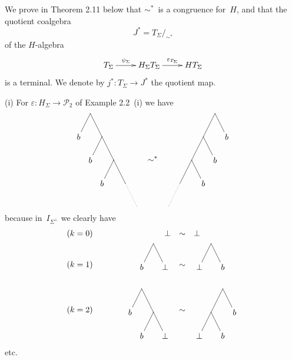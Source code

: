 \documentclass{entcs}
\newcommand{\sims}{\ensuremath{\mathrel{\sim^*}}}
\newcommand{\PP}{\ensuremath{\mathscr{P}}}
\newenvironment{pv}[1]{\begin{trivlist}
\item[\hspace{\labelsep}\normalfont\bfseries#1]}%
{\end{trivlist}}
\begin{document}
\begin{pv}{Remark}
We prove in Theorem 2.11 below that \sims~is a congruence for~$H$,
and that the quotient coalgebra
\[J^*=T_\Sigma/_{\sims}\]
of the  $H$-algebra\vspace{1mm}
\[
\xy
\xymatrix{
T_\Sigma
\ar[0,1]^-{\psi_\Sigma}
&
H_\Sigma T_\Sigma
\ar[0,1]^-{\varepsilon_{T_\Sigma}}
&
HT_\Sigma
}
\endxy
\]
is a terminal. We denote by $j^*\colon T_\Sigma\to J^*$ the quotient
map.
\end{pv}

\begin{pv}{2.10 Examples}
(i) For $\varepsilon\colon H_\Sigma\to\PP_{\!2}$ of Example
2.2~(i) we have
\[                                   %
\vcenter{
\xy
\POS (00, 00) *+{b} = "b1"
   , (05, 10)       = "t1"
   , (10, 00)       = "t2"
   , (05,-10) *+{b} = "b2"
   , (15,-10)       = "t3"
   , (10,-20) *+{b} = "b3"
   , (20,-20)       = "t4"
   , (25,-30)        = "x"
\POS "b1" \ar@{-} "t1"
\POS "t2" \ar@{-} "t1"
\POS "b2" \ar@{-} "t2"
\POS "t3" \ar@{-} "t2"
\POS "b3" \ar@{-} "t3"
\POS "t4" \ar@{-} "t3"
\POS "x" \ar@{.} "t4"
\endxy
}
\quad\sims\quad
\vcenter{
\xy
\POS ( 00, 00) *+{b} = "b1"
   , (-05, 10)       = "t1"
   , (-10, 00)       = "t2"
   , (-05,-10) *+{b} = "b2"
   , (-15,-10)       = "t3"
   , (-10,-20) *+{b} = "b3"
   , (-20,-20)       = "t4"
   , (-25,-30)        = "x"
\POS "b1" \ar@{-} "t1"
\POS "t2" \ar@{-} "t1"
\POS "b2" \ar@{-} "t2"
\POS "t3" \ar@{-} "t2"
\POS "b3" \ar@{-} "t3"
\POS "t4" \ar@{-} "t3"
\POS "x" \ar@{.} "t4"
\endxy
}
\]
because in~$I_{\Sigma^\perp}$ we clearly have
\[                                   %
\begin{array}{rcrcl}
(k=0)
&\qquad&
\perp
&\sim&
\perp
\\[2mm]
(k=1)
&&
\xy
\POS (00,00) *+{b}     = "b"
   , (10,00) *+{\perp} = "p"
   , (05,10)           = "t"
\POS "b" \ar@{-} "t"
\POS "p" \ar@{-} "t"
\endxy
&\sim&
\xy
\POS (00,00) *+{\perp} = "b"
   , (10,00) *+{b}     = "p"
   , (05,10)           = "t"
\POS "b" \ar@{-} "t"
\POS "p" \ar@{-} "t"
\endxy
\\[8mm]
(k=2)
&&
\xy
\POS (00, 00) *+{b} = "b1"
   , (05, 10)       = "t1"
   , (10, 00)       = "t2"
   , (05,-10) *+{b} = "b2"
   , (15,-10) *+{\perp} = "t3"
\POS "b1" \ar@{-} "t1"
\POS "t2" \ar@{-} "t1"
\POS "b2" \ar@{-} "t2"
\POS "t3" \ar@{-} "t2"
\endxy
&\sim&
\xy
\POS ( 00, 00) *+{b} = "b1"
   , (-05, 10)       = "t1"
   , (-10, 00)       = "t2"
   , (-05,-10) *+{b} = "b2"
   , (-15,-10) *+{\perp} = "t3"
\POS "b1" \ar@{-} "t1"
\POS "t2" \ar@{-} "t1"
\POS "b2" \ar@{-} "t2"
\POS "t3" \ar@{-} "t2"
\endxy
\end{array}
\]
etc.


\end{pv}
\end{document}
